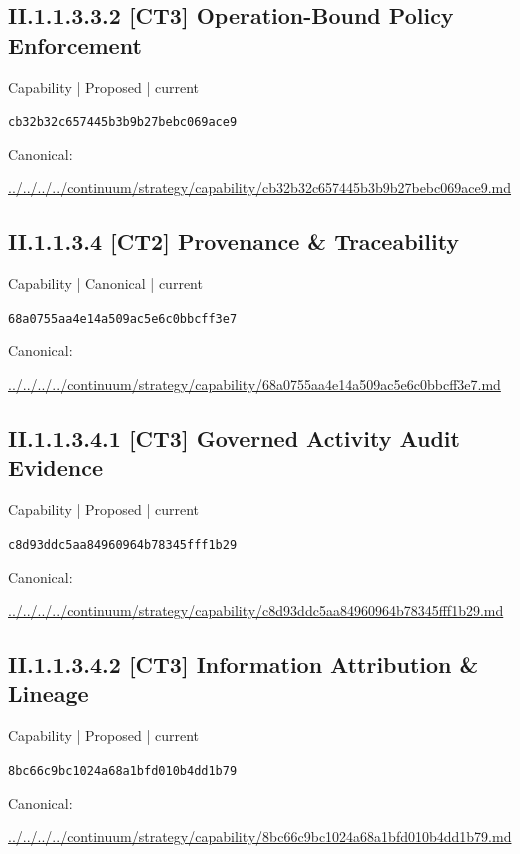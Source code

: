\documentclass[10pt,a4paper]{article}
\begin{document}
\subsection*{II.1.1.3.3.2 [CT3] Operation-Bound Policy Enforcement}
{\small Capability | Proposed | current}\par
\texttt{cb32b32c657445b3b9b27bebc069ace9}\par
Canonical: \par
{\footnotesize\url{../../../../continuum/strategy/capability/cb32b32c657445b3b9b27bebc069ace9.md}}\par
\subsection*{II.1.1.3.4 [CT2] Provenance \& Traceability}
{\small Capability | Canonical | current}\par
\texttt{68a0755aa4e14a509ac5e6c0bbcff3e7}\par
Canonical: \par
{\footnotesize\url{../../../../continuum/strategy/capability/68a0755aa4e14a509ac5e6c0bbcff3e7.md}}\par
\subsection*{II.1.1.3.4.1 [CT3] Governed Activity Audit Evidence}
{\small Capability | Proposed | current}\par
\texttt{c8d93ddc5aa84960964b78345fff1b29}\par
Canonical: \par
{\footnotesize\url{../../../../continuum/strategy/capability/c8d93ddc5aa84960964b78345fff1b29.md}}\par
\subsection*{II.1.1.3.4.2 [CT3] Information Attribution \& Lineage}
{\small Capability | Proposed | current}\par
\texttt{8bc66c9bc1024a68a1bfd010b4dd1b79}\par
Canonical: \par
{\footnotesize\url{../../../../continuum/strategy/capability/8bc66c9bc1024a68a1bfd010b4dd1b79.md}}\par
\end{document}

